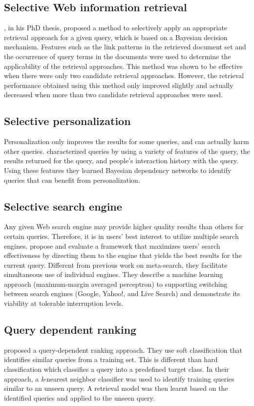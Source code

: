 \subsection{Selective Web information retrieval}
\citet*{plachouras2006selective}, in his PhD thesis, proposed a method to selectively apply an appropriate retrieval approach for a given query, which is based on a Bayesian decision mechanism. Features such as the link patterns in the retrieved document set and the occurrence of query terms in the documents were used to determine the applicability of the retrieval approaches. This method was shown to be effective when there were only two candidate retrieval approaches. However, the retrieval performance obtained using this method only improved slightly and actually decreased when more than two candidate retrieval approaches were used.

\subsection{Selective personalization}
Personalization only improves the results for some queries, and can actually harm other queries.
\citet*{SelectivePersonalization} characterized queries by using a variety of features of the query, the results returned for the query, and people's interaction history with the query. 
Using these features they learned Bayesian dependency networks to identify queries that can benefit from personalization.

\subsection{Selective search engine}
Any given Web search engine may provide higher quality results than others for certain queries. Therefore, it is in users' best interest to utilize multiple search engines.
\citet*{SelectiveSearchEngine} propose and evaluate a framework that maximizes users' search effectiveness by directing them to the engine that yields the best results for the current query. Different from previous work on meta-search, they facilitate simultaneous use of individual engines. They describe a machine learning approach (maximum-margin averaged perceptron) to supporting switching between search engines (Google, Yahoo!, and Live Search) and demonstrate its viability at tolerable interruption levels. 

\subsection{Query dependent ranking}
\citet*{QueryDependentRanking} proposed a query-dependent ranking approach. They use soft classification that identifies similar queries from a training set. This is different than hard classification which classifies a query into a predefined target class. In their approach, a \emph{k}-nearest neighbor classifier was used to identify training queries similar to an unseen query. A retrieval model was then learnt based on the identified queries and applied to the unseen query.


